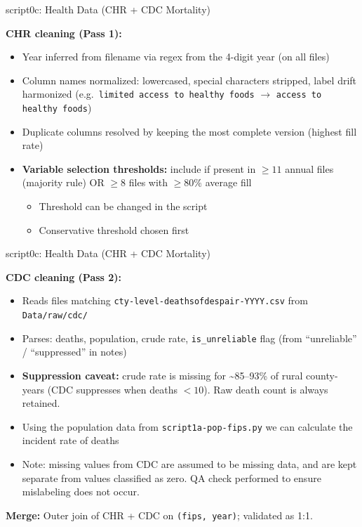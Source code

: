 \documentclass[aspectratio=169]{beamer}
\begin{document}
\begin{frame}{script0c: Health Data (CHR + CDC Mortality)}

\textbf{CHR cleaning (Pass 1):}
\begin{itemize}\small
    \item Year inferred from filename via regex from the 4-digit year (on all files)
    \item Column names normalized: lowercased, special characters stripped, label drift harmonized (e.g.\ \texttt{limited access to healthy foods} $\rightarrow$ \texttt{access to healthy foods})
    \item Duplicate columns resolved by keeping the most complete version (highest fill rate)
    \item \textbf{Variable selection thresholds:} include if present in $\geq 11$ annual files (majority rule) OR $\geq 8$ files with $\geq 80\%$ average fill
    \begin{itemize}
        \item[a] Threshold can be changed in the script
        \item[b] Conservative threshold chosen first
    \end{itemize}
\end{itemize}

\end{frame}


\begin{frame}{script0c: Health Data (CHR + CDC Mortality)}

\textbf{CDC cleaning (Pass 2):}
\begin{itemize}\small
    \item Reads files matching \texttt{cty-level-deathsofdespair-YYYY.csv} from \texttt{Data/raw/cdc/}
    \item Parses: deaths, population, crude rate, \texttt{is\_unreliable} flag (from ``unreliable'' / ``suppressed'' in notes)
    \item \textbf{Suppression caveat:} crude rate is missing for \textasciitilde85--93\% of rural county-years (CDC suppresses when deaths $< 10$). Raw death count is always retained.
    \item Using the population data from \texttt{script1a-pop-fips.py} we can calculate the incident rate of deaths
    \item Note: missing values from CDC are assumed to be missing data, and are kept separate from values classified as zero. QA check performed to ensure mislabeling does not occur. 
\end{itemize}

\textbf{Merge:} Outer join of CHR + CDC on \texttt{(fips, year)}; validated as 1:1. 
\end{frame}
\end{document}
